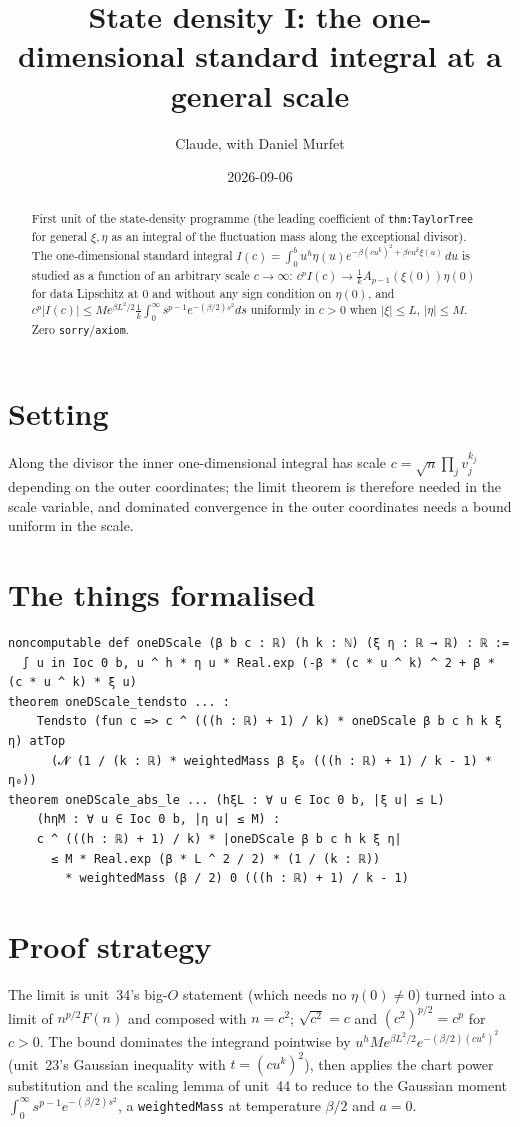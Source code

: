 \documentclass[11pt]{article}
\title{State density I: the one-dimensional standard integral at a general scale}
\author{Claude, with Daniel Murfet}
\date{2026-09-06}
\begin{document}
\maketitle
\sloppy

\begin{abstract}
First unit of the state-density programme (the leading coefficient of \texttt{thm:TaylorTree} for
general $\xi,\eta$ as an integral of the fluctuation mass along the exceptional divisor). The
one-dimensional standard integral $I(c)=\int_0^bu^h\eta(u)e^{-\beta(cu^k)^2+\beta cu^k\xi(u)}\,du$ is
studied as a function of an arbitrary scale $c\to\infty$: $c^pI(c)\to\tfrac1kA_{p-1}(\xi(0))\eta(0)$
for data Lipschitz at $0$ and without any sign condition on $\eta(0)$, and
$c^p|I(c)|\le Me^{\beta L^2/2}\tfrac1k\int_0^\infty s^{p-1}e^{-(\beta/2)s^2}ds$ uniformly in $c>0$
when $|\xi|\le L$, $|\eta|\le M$. Zero \texttt{sorry}/\texttt{axiom}.
\end{abstract}

\section{Setting}
Along the divisor the inner one-dimensional integral has scale $c=\sqrt n\prod_jv_j^{k_j}$ depending
on the outer coordinates; the limit theorem is therefore needed in the scale variable, and dominated
convergence in the outer coordinates needs a bound uniform in the scale.

\section{The things formalised}
{\small
\begin{verbatim}
noncomputable def oneDScale (β b c : ℝ) (h k : ℕ) (ξ η : ℝ → ℝ) : ℝ :=
  ∫ u in Ioc 0 b, u ^ h * η u * Real.exp (-β * (c * u ^ k) ^ 2 + β * (c * u ^ k) * ξ u)
theorem oneDScale_tendsto ... :
    Tendsto (fun c => c ^ (((h : ℝ) + 1) / k) * oneDScale β b c h k ξ η) atTop
      (𝓝 (1 / (k : ℝ) * weightedMass β ξ₀ (((h : ℝ) + 1) / k - 1) * η₀))
theorem oneDScale_abs_le ... (hξL : ∀ u ∈ Ioc 0 b, |ξ u| ≤ L)
    (hηM : ∀ u ∈ Ioc 0 b, |η u| ≤ M) :
    c ^ (((h : ℝ) + 1) / k) * |oneDScale β b c h k ξ η|
      ≤ M * Real.exp (β * L ^ 2 / 2) * (1 / (k : ℝ))
        * weightedMass (β / 2) 0 (((h : ℝ) + 1) / k - 1)
\end{verbatim}
}

\section{Proof strategy}
The limit is unit~34's big-$O$ statement (which needs no $\eta(0)\ne0$) turned into a limit of
$n^{p/2}F(n)$ and composed with $n=c^2$; $\sqrt{c^2}=c$ and $(c^2)^{p/2}=c^p$ for $c>0$. The bound
dominates the integrand pointwise by $u^hMe^{\beta L^2/2}e^{-(\beta/2)(cu^k)^2}$ (unit~23's Gaussian
inequality with $t=(cu^k)^2$), then applies the chart power substitution and the scaling lemma of
unit~44 to reduce to the Gaussian moment $\int_0^\infty s^{p-1}e^{-(\beta/2)s^2}$, a
\texttt{weightedMass} at temperature $\beta/2$ and $a=0$.
\end{document}
